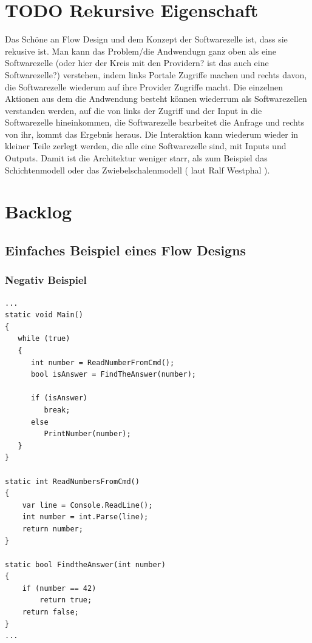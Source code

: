 \documentclass[11pt]{article}
\begin{document}
\section{{\bfseries\sffamily TODO} Rekursive Eigenschaft}
\label{sec:orgheadline71}
Das Schöne an Flow Design und dem Konzept der Softwarezelle ist, dass sie rekusive ist.
Man kann das Problem/die Andwendugn ganz oben als eine Softwarezelle (oder hier der Kreis mit den Providern? ist das auch eine Softwarezelle?)
verstehen, indem links Portale Zugriffe machen und rechts davon, die Softwarezelle wiederum auf ihre Provider Zugriffe macht.
Die einzelnen Aktionen aus dem die Andwendung besteht können wiederrum als Softwarezellen verstanden werden, auf die von links 
der Zugriff und der Input in die Softwarezelle hineinkommen, die Softwarezelle bearbeitet die Anfrage und rechts von ihr, kommt das
Ergebnis heraus. Die Interaktion kann wiederum wieder in kleiner Teile zerlegt werden, die alle eine Softwarezelle sind, mit Inputs und
Outputs. Damit ist die Architektur weniger starr, als zum Beispiel das Schichtenmodell oder das Zwiebelschalenmodell ( laut Ralf Westphal ). 



\section{Backlog}
\label{sec:orgheadline74}
\subsection{Einfaches Beispiel eines Flow Designs}
\label{sec:orgheadline73}
\subsubsection{Negativ Beispiel}
\label{sec:orgheadline72}
\begin{verbatim}
...
static void Main()
{
   while (true)
   {
      int number = ReadNumberFromCmd();
      bool isAnswer = FindTheAnswer(number);

      if (isAnswer)
         break;
      else
         PrintNumber(number);
   }
}

static int ReadNumbersFromCmd()
{
    var line = Console.ReadLine();
    int number = int.Parse(line);
    return number;
}

static bool FindtheAnswer(int number)
{ 
    if (number == 42)
        return true;
    return false;
}
...
\end{verbatim}
\end{document}
